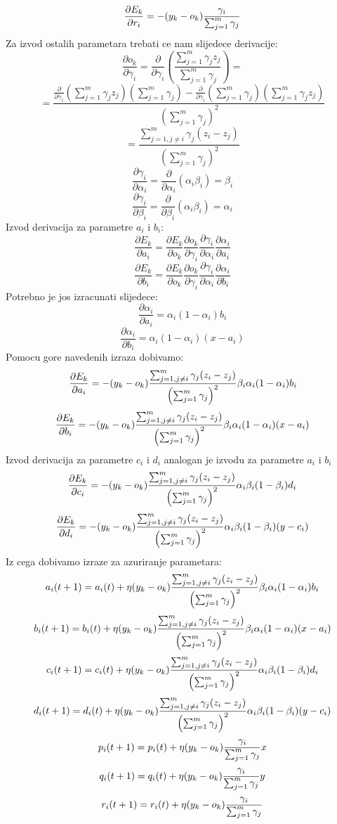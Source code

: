 \documentclass[a4paper, 11pt]{article}
\begin{document}
$$\frac{\partial E_{k}}{\partial r_{i}}=-(y_{k}-o_{k})\frac{\gamma_{i}}{\sum_{j=1}^{m}\gamma_{j}}$$
Za izvod ostalih parametara trebati ce nam slijedece derivacije:
\newcommand{\upperr}{\sum_{j=1}^{m}\gamma_{j}z_{j}}
\newcommand{\lowerr}{\sum_{j=1}^{m}\gamma_{j}}
$$\frac{\partial o_{k}}{\partial\gamma_{i}} = \frac{\partial}{\partial\gamma_{i}}\left (\frac{\upperr}{\lowerr}\right )=$$
$$= \frac{\frac{\partial}{\partial\gamma_{i}}\left (\upperr\right )\left(\lowerr\right)-\frac{\partial}{\partial\gamma_{i}}\left (\lowerr\right )\left(\upperr\right)}{\left(\lowerr\right)^{2}}$$
\newcommand{\dokdgamma}{ \frac{\sum_{j=1,j\neq i}^{m}\gamma_{j}(z_{i}-z_{j})}{\left(\lowerr\right)^{2}}}
\newcommand{\dgammadalpha}{ \beta_{i}}
\newcommand{\dgammadbeta}{\alpha_{i}}
$$=\dokdgamma$$
$$\frac{\partial \gamma_{i}}{\partial\alpha_{i}} = \frac{\partial}{\partial\alpha_{i}}\left(\alpha_{i}\beta_{i}\right)= \dgammadalpha$$
$$\frac{\partial \gamma_{i}}{\partial\beta_{i}} = \frac{\partial}{\partial\beta_{i}}\left(\alpha_{i}\beta_{i}\right)= \dgammadbeta$$
Izvod derivacija za parametre $a_{i}$ i $b_{i}$:
$$\frac{\partial E_{k}}{\partial a_{i}}=\frac{\partial E_{k}}{\partial o_{k}}\frac{\partial o_{k}}{\partial \gamma_{i}}\frac{\partial \gamma_{i}}{\partial \alpha_{i}}\frac{\partial \alpha_{i}}{\partial a_{i}}$$
$$\frac{\partial E_{k}}{\partial b_{i}}=\frac{\partial E_{k}}{\partial o_{k}}\frac{\partial o_{k}}{\partial \gamma_{i}}\frac{\partial \gamma_{i}}{\partial \alpha_{i}}\frac{\partial \alpha_{i}}{\partial b_{i}}$$
Potrebno je jos izracunati slijedece:
\newcommand{\sigmoidalphad}{\alpha_{i}(1-\alpha_{i})}
\newcommand{\dalphada}{\sigmoidalphad b_{i}}
\newcommand{\dalphadb}{\sigmoidalphad (x - a_{i})}
\newcommand{\sigmoidbetad}{\beta_{i}(1-\beta_{i})}
\newcommand{\dbetadc}{\sigmoidbetad d_{i}}
\newcommand{\dbetadd}{\sigmoidbetad (y - c_{i})}
$$\frac{\partial \alpha_{i}}{\partial a_{i}} = \dalphada$$
$$\frac{\partial \alpha_{i}}{\partial b_{i}} = \dalphadb$$
Pomocu gore navedenih izraza dobivamo:
$$\frac{\partial E_{k}}{\partial a_{i}}=-\minusdEkdok \dokdgamma \dgammadalpha \dalphada$$
$$\frac{\partial E_{k}}{\partial b_{i}}=-\minusdEkdok \dokdgamma \dgammadalpha \dalphadb$$
Izvod derivacija za parametre $c_{i}$ i $d_{i}$ analogan je izvodu za parametre $a_{i}$ i $b_{i}$ 
$$\frac{\partial E_{k}}{\partial c_{i}}=-\minusdEkdok \dokdgamma \dgammadbeta \dbetadc$$
$$\frac{\partial E_{k}}{\partial d_{i}}=-\minusdEkdok \dokdgamma \dgammadbeta \dbetadd$$
Iz cega dobivamo izraze za azuriranje parametara:
$$a_{i}(t+1) =a_{i}(t)+\eta\minusdEkdok \dokdgamma \dgammadalpha \dalphada$$
$$b_{i}(t+1) =b_{i}(t)+\eta\minusdEkdok \dokdgamma \dgammadalpha \dalphadb$$
$$c_{i}(t+1) =c_{i}(t)+\eta\minusdEkdok \dokdgamma \dgammadbeta \dbetadc$$
$$d_{i}(t+1) =d_{i}(t)+\eta\minusdEkdok \dokdgamma \dgammadbeta \dbetadd	$$
$$p_{i}(t+1) =p_{i}(t)+\eta(y_{k}-o_{k})\frac{\gamma_{i}}{\sum_{j=1}^{m}\gamma_{j}} x$$
$$q_{i}(t+1) =q_{i}(t)+\eta(y_{k}-o_{k})\frac{\gamma_{i}}{\sum_{j=1}^{m}\gamma_{j}} y$$
$$r_{i}(t+1) =r_{i}(t)+\eta(y_{k}-o_{k})\frac{\gamma_{i}}{\sum_{j=1}^{m}\gamma_{j}} $$
\end{document}
